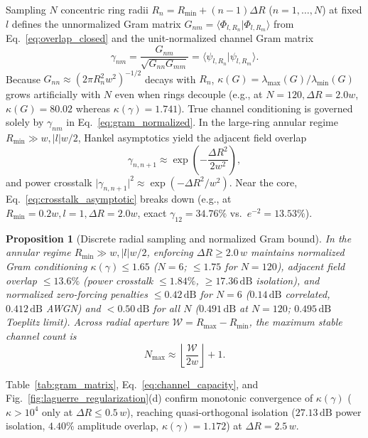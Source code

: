 \documentclass[aps,pra,reprint,amsmath,amssymb,floatfix,longbibliography]{revtex4-2}
\providecommand{\braket}[2]{\langle#1\vert#2\rangle}
\providecommand{\abs}[1]{\lvert#1\rvert}
\newtheorem{proposition}{Proposition}
\begin{document}
Sampling $N$ concentric ring radii $R_n = R_{\min} + (n-1)\Delta R$ ($n=1,\dots,N$) at fixed $l$ defines the unnormalized Gram matrix $G_{nm} = \braket{\Phi_{l,R_n}}{\Phi_{l,R_m}}$ from Eq.~\eqref{eq:overlap_closed} and the unit-normalized channel Gram matrix
\begin{equation}
\gamma_{nm} = \frac{G_{nm}}{\sqrt{G_{nn} G_{mm}}} = \braket{\psi_{l,R_n}}{\psi_{l,R_m}}.
\label{eq:gram_normalized}
\end{equation}
Because $G_{nn} \approx (2\pi R_n^2 w^2)^{-1/2}$ decays with $R_n$, $\kappa(G) = \lambda_{\max}(G)/\lambda_{\min}(G)$ grows artificially with $N$ even when rings decouple (e.g., at $N=120, \Delta R = 2.0w$, $\kappa(G) = 80.02$ whereas $\kappa(\gamma) = 1.741$). True channel conditioning is governed solely by $\gamma_{nm}$ in Eq.~\eqref{eq:gram_normalized}. In the large-ring annular regime $R_{\min} \gg w, \abs{l}w/2$, Hankel asymptotics yield the adjacent field overlap
\begin{equation}
\gamma_{n,n+1} \approx \exp\!\left(-\frac{\Delta R^2}{2w^2}\right),
\label{eq:crosstalk_asymptotic}
\end{equation}
and power crosstalk $\abs{\gamma_{n,n+1}}^2 \approx \exp(-\Delta R^2/w^2)$. Near the core, Eq.~\eqref{eq:crosstalk_asymptotic} breaks down (e.g., at $R_{\min} = 0.2w, l=1, \Delta R = 2.0w$, exact $\gamma_{12} = 34.76\%$ vs.\ $e^{-2} = 13.53\%$).

\begin{proposition}[Discrete radial sampling and normalized Gram bound]
\label{prop:channel_capacity}
In the annular regime $R_{\min} \gg w, \abs{l}w/2$, enforcing $\Delta R \ge 2.0\,w$ maintains normalized Gram conditioning $\kappa(\gamma) \le 1.65$ ($N=6$; $\le 1.75$ for $N=120$), adjacent field overlap $\le 13.6\%$ (power crosstalk $\le 1.84\%$, $\ge 17.36\,\mathrm{dB}$ isolation), and normalized zero-forcing penalties $\le 0.42\,\mathrm{dB}$ for $N=6$ ($0.14\,\mathrm{dB}$ correlated, $0.412\,\mathrm{dB}$ AWGN) and $< 0.50\,\mathrm{dB}$ for all $N$ ($0.491\,\mathrm{dB}$ at $N=120$; $0.495\,\mathrm{dB}$ Toeplitz limit). Across radial aperture $\mathcal{W} = R_{\max} - R_{\min}$, the maximum stable channel count is
\begin{equation}
N_{\max} \approx \left\lfloor \frac{\mathcal{W}}{2w} \right\rfloor + 1.
\label{eq:channel_capacity}
\end{equation}
\end{proposition}

Table~\ref{tab:gram_matrix}, Eq.~\eqref{eq:channel_capacity}, and Fig.~\ref{fig:laguerre_regularization}(d) confirm monotonic convergence of $\kappa(\gamma)$ ($\kappa > 10^4$ only at $\Delta R \le 0.5\,w$), reaching quasi-orthogonal isolation ($27.13\,\mathrm{dB}$ power isolation, $4.40\%$ amplitude overlap, $\kappa(\gamma) = 1.172$) at $\Delta R = 2.5\,w$.
\end{document}
